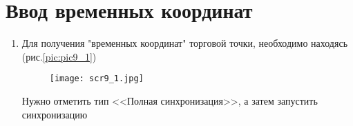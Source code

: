 \section{Ввод временных координат}
\begin{enumerate}[\thesection .1]
	\item Для получения "временных координат" торговой точки, необходимо находясь 
	(рис.\ref{pic:pic9_1})
	\begin{figure}[!h]
		\begin{floatrow}
			{\texttt{[image: scr9\_1.jpg]}}
		\end{floatrow}
	\end{figure}
	Нужно отметить тип <<Полная синхронизация>>, а затем запустить синхронизацию
\end{enumerate}	